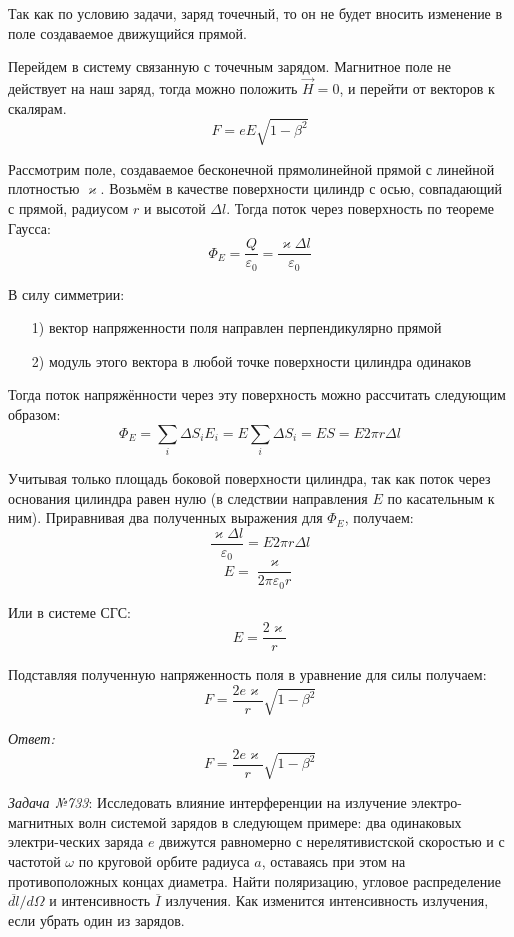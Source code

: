\newpage

Так как по условию задачи, заряд точечный, то он не будет вносить изменение 
в поле создаваемое движущийся прямой. 

Перейдем в систему связанную с точечным зарядом. 
Магнитное поле не действует на наш заряд, тогда можно положить \( \vec{H} = 0 \), 
и перейти от векторов к скалярам.
\[ F = eE\sqrt{1-\beta^2} \]

Рассмотрим поле, создаваемое бесконечной прямолинейной прямой с линейной плотностью 
\( \varkappa \). Возьмём в качестве поверхности цилиндр с осью, 
совпадающий с прямой, радиусом \( r \) и высотой \( \Delta l \). Тогда поток через 
поверхность по теореме Гаусса:
\[ \Phi_E = \frac{Q}{\varepsilon_0} = \frac{\varkappa\Delta l}{\varepsilon_0} \]

В силу симметрии:
\vspace*{-1em}
\begin{itemize}\itemsep-8pt
	\item[1)] вектор напряженности поля направлен перпендикулярно прямой
	\item[2)] модуль этого вектора в любой точке поверхности цилиндра одинаков
\end{itemize}

Тогда поток напряжённости через эту поверхность можно рассчитать следующим образом:
\[ \Phi_E = \sum_i \Delta S_i E_i = E\sum_i\Delta S_i = ES = E2\pi r\Delta l \]

Учитывая только площадь боковой поверхности цилиндра, так как поток через основания 
цилиндра равен нулю (в следствии направления \( E \) по касательным к ним). 
Приравнивая два полученных выражения для \( \Phi_E \), получаем:
\[ \frac{\varkappa \Delta l}{\varepsilon_0} = E2\pi r\Delta l \]
\[ E = \frac{\varkappa}{2\pi\varepsilon_0 r} \]

Или в системе СГС:
\[ E = \frac{2\varkappa}{r} \]

Подставляя полученную напряженность поля в уравнение для силы получаем:
\[ F = \frac{2e\varkappa}{r}\sqrt{1-\beta^2} \]

\emph{Ответ:}
\[ F = \frac{2e\varkappa}{r}\sqrt{1-\beta^2} \]

\newpage


\emph{Задача №733}: Исследовать влияние интерференции на излучение 
электро-магнитных волн системой зарядов в следующем примере: два одинаковых
электри-ческих заряда \( e \) движутся равномерно с нерелятивистской скоростью
и с частотой \( \omega \) по круговой орбите радиуса \( a \), оставаясь при
этом на противоположных концах диаметра. Найти поляризацию, угловое 
распределение \( \overline{dl}/d\Omega \) и интенсивность \( \overline{I} \)
излучения. Как изменится интенсивность излучения, если убрать один из зарядов.

